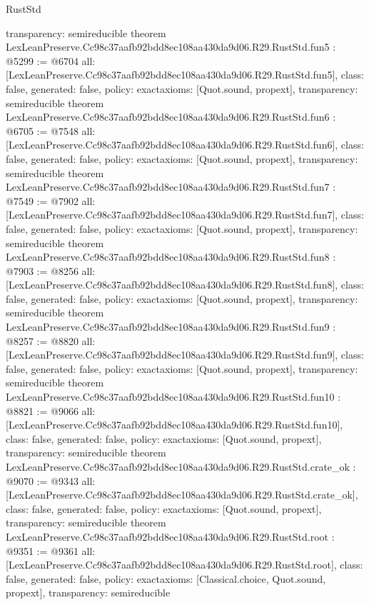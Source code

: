 \begin{lexlean}{RustStd}
\begin{coremodule}
{  transparency: semireducible
}
theorem LexLeanPreserve.Cc98c37aafb92bdd8ec108aa430da9d06.R29.RustStd.fun5 : @5299 := @6704 {
  all: [LexLeanPreserve.Cc98c37aafb92bdd8ec108aa430da9d06.R29.RustStd.fun5],
  class: false,
  generated: false,
  policy: exact{axioms: [Quot.sound, propext]},
  transparency: semireducible
}
theorem LexLeanPreserve.Cc98c37aafb92bdd8ec108aa430da9d06.R29.RustStd.fun6 : @6705 := @7548 {
  all: [LexLeanPreserve.Cc98c37aafb92bdd8ec108aa430da9d06.R29.RustStd.fun6],
  class: false,
  generated: false,
  policy: exact{axioms: [Quot.sound, propext]},
  transparency: semireducible
}
theorem LexLeanPreserve.Cc98c37aafb92bdd8ec108aa430da9d06.R29.RustStd.fun7 : @7549 := @7902 {
  all: [LexLeanPreserve.Cc98c37aafb92bdd8ec108aa430da9d06.R29.RustStd.fun7],
  class: false,
  generated: false,
  policy: exact{axioms: [Quot.sound, propext]},
  transparency: semireducible
}
theorem LexLeanPreserve.Cc98c37aafb92bdd8ec108aa430da9d06.R29.RustStd.fun8 : @7903 := @8256 {
  all: [LexLeanPreserve.Cc98c37aafb92bdd8ec108aa430da9d06.R29.RustStd.fun8],
  class: false,
  generated: false,
  policy: exact{axioms: [Quot.sound, propext]},
  transparency: semireducible
}
theorem LexLeanPreserve.Cc98c37aafb92bdd8ec108aa430da9d06.R29.RustStd.fun9 : @8257 := @8820 {
  all: [LexLeanPreserve.Cc98c37aafb92bdd8ec108aa430da9d06.R29.RustStd.fun9],
  class: false,
  generated: false,
  policy: exact{axioms: [Quot.sound, propext]},
  transparency: semireducible
}
theorem LexLeanPreserve.Cc98c37aafb92bdd8ec108aa430da9d06.R29.RustStd.fun10 : @8821 := @9066 {
  all: [LexLeanPreserve.Cc98c37aafb92bdd8ec108aa430da9d06.R29.RustStd.fun10],
  class: false,
  generated: false,
  policy: exact{axioms: [Quot.sound, propext]},
  transparency: semireducible
}
theorem LexLeanPreserve.Cc98c37aafb92bdd8ec108aa430da9d06.R29.RustStd.crate_ok : @9070 := @9343 {
  all: [LexLeanPreserve.Cc98c37aafb92bdd8ec108aa430da9d06.R29.RustStd.crate_ok],
  class: false,
  generated: false,
  policy: exact{axioms: [Quot.sound, propext]},
  transparency: semireducible
}
theorem LexLeanPreserve.Cc98c37aafb92bdd8ec108aa430da9d06.R29.RustStd.root : @9351 := @9361 {
  all: [LexLeanPreserve.Cc98c37aafb92bdd8ec108aa430da9d06.R29.RustStd.root],
  class: false,
  generated: false,
  policy: exact{axioms: [Classical.choice, Quot.sound, propext]},
  transparency: semireducible
}


\end{coremodule}
\end{lexlean}
